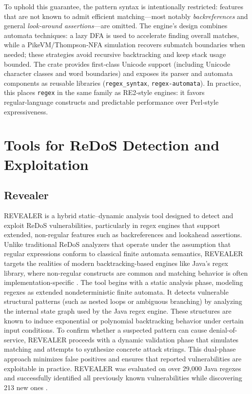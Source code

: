 To uphold this guarantee, the pattern syntax is intentionally restricted: features that are not known to admit efficient matching—most notably \emph{backreferences} and general \emph{look‑around assertions}—are omitted. The engine’s design combines automata techniques: a lazy DFA is used to accelerate finding overall matches, while a PikeVM/Thompson‑NFA simulation recovers submatch boundaries when needed; these strategies avoid recursive backtracking and keep stack usage bounded. The crate provides first‑class Unicode support (including Unicode character classes and word boundaries) and exposes its parser and automata components as reusable libraries (\texttt{regex\_syntax}, \texttt{regex-automata}). In practice, this places \texttt{regex} in the same family as RE2‑style engines: it favors regular‑language constructs and predictable performance over Perl‑style expressiveness.

\section{Tools for ReDoS Detection and Exploitation}
\subsection{Revealer}
REVEALER is a hybrid static–dynamic analysis tool designed to detect and exploit ReDoS vulnerabilities, particularly in regex engines that support extended, non-regular features such as backreferences and lookahead assertions. Unlike traditional ReDoS analyzers that operate under the assumption that regular expressions conform to classical finite automata semantics, REVEALER targets the realities of modern backtracking-based engines like Java’s regex library, where non-regular constructs are common and matching behavior is often implementation-specific \cite{revealer_paper}.
The tool begins with a static analysis phase, modeling regexes as extended nondeterministic finite automata. It detects vulnerable structural patterns (such as nested loops or ambiguous branching) by analyzing the internal state graph used by the Java regex engine. These structures are known to induce exponential or polynomial backtracking behavior under certain input conditions. To confirm whether a suspected pattern can cause denial-of-service, REVEALER proceeds with a dynamic validation phase that simulates matching and attempts to synthesize concrete attack strings. This dual-phase approach minimizes false positives and ensures that reported vulnerabilities are exploitable in practice.
REVEALER was evaluated on over 29,000 Java regexes and successfully identified all previously known vulnerabilities while discovering 213 new ones \cite{revealer_paper}.

